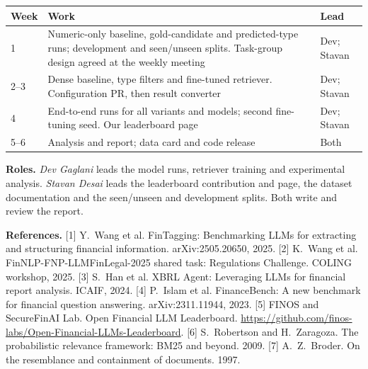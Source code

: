 \documentclass[10pt]{article}
\begin{document}
\begin{table}[h]
\centering\small
\begin{tabular}{p{1.1cm}p{10.3cm}p{2.6cm}}
\toprule
Week & Work & Lead \\
\midrule
1    & Numeric-only baseline, gold-candidate and predicted-type runs; development and seen/unseen splits. Task-group design agreed at the
weekly meeting & Dev; Stavan \\
2--3 & Dense baseline, type filters and fine-tuned retriever. Configuration PR, then result converter & Dev; Stavan \\
4    & End-to-end runs for all variants and models; second fine-tuning seed. Our leaderboard page & Dev; Stavan \\
5--6 & Analysis and report; data card and code release & Both \\
\bottomrule
\end{tabular}
\end{table}
\textbf{Roles.} \emph{Dev Gaglani} leads the model runs, retriever training and experimental analysis. \emph{Stavan
Desai} leads the leaderboard contribution and page, the dataset documentation and the seen/unseen and development
splits. Both write and review the report.

\vspace{3pt}
{\footnotesize\textbf{References.}
[1] Y.~Wang et al. FinTagging: Benchmarking LLMs for extracting and structuring financial information. arXiv:2505.20650, 2025.
[2] K.~Wang et al. FinNLP-FNP-LLMFinLegal-2025 shared task: Regulations Challenge. COLING workshop, 2025.
[3] S.~Han et al. XBRL Agent: Leveraging LLMs for financial report analysis. ICAIF, 2024.
[4] P.~Islam et al. FinanceBench: A new benchmark for financial question answering. arXiv:2311.11944, 2023.
[5] FINOS and SecureFinAI Lab. Open Financial LLM Leaderboard. \url{https://github.com/finos-labs/Open-Financial-LLMs-Leaderboard}.
[6] S.~Robertson and H.~Zaragoza. The probabilistic relevance framework: BM25 and beyond. 2009.
[7] A.~Z.~Broder. On the resemblance and containment of documents. 1997.\par}
\end{document}
